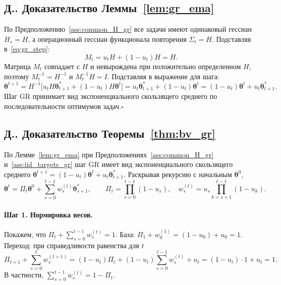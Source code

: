 \documentclass[a4paper,14pt,oneside,openany]{extarticle}
\newcommand{\btheta}{\boldsymbol{\theta}}
\begin{document}
\setcounter{appthm}{0}
\renewcommand{\theappthm}{Д.}

\subsection*{\theappthm. Доказательство Леммы~\ref{lem:gr_ema}}\label{app:proof_gr_ema}

По Предположению~\ref{ass:common_H_gr} все задачи имеют одинаковый гессиан $H_s = H$, а операционный гессиан функционала повторения $\Sigma_t = H$. Подставляя в~\eqref{eq:gr_step}:
\[
    M_t = u_t H + (1 - u_t) H = H.
\]
Матрица $M_t$ совпадает с $H$ и невырождена при положительно определенном $H$, поэтому $M_t^{-1} = H^{-1}$ и $M_t^{-1} H = I$. Подставляя в выражение для шага:
\[
    \btheta^{t+1} = H^{-1}\bigl[u_t H \btheta^*_{t+1} + (1 - u_t) H \btheta^t\bigr] = u_t \btheta^*_{t+1} + (1 - u_t)\btheta^t = (1 - u_t)\btheta^t + u_t \btheta^*_{t+1}.
\]
Шаг GR принимает вид экспоненциального скользящего среднего по последовательности оптимумов задач.\hfill$\square$

\subsection*{\theappthm. Доказательство Теоремы~\ref{thm:bv_gr}}\label{app:proof_bv_gr}

По Лемме~\ref{lem:gr_ema} при Предположениях~\ref{ass:common_H_gr} и~\ref{ass:iid_targets_gr} шаг GR имеет вид экспоненциального скользящего среднего $\btheta^{t+1} = (1 - u_t)\btheta^t + u_t \btheta^*_{t+1}$. Раскрывая рекурсию с начальным $\btheta^0$,
\begin{equation}
    \btheta^t = \Pi_t \btheta^0 + \sum_{s=0}^{t-1} w_s^{(t)} \btheta^*_{s+1}, \qquad \Pi_t = \prod_{s=0}^{t-1}(1 - u_s), \quad w_s^{(t)} = u_s \prod_{k=s+1}^{t-1}(1 - u_k).
    \label{eq:app_unrolled}
\end{equation}

\paragraph{Шаг 1. Нормировка весов.} Покажем, что $\Pi_t + \sum_{s=0}^{t-1} w_s^{(t)} = 1$. База: $\Pi_1 + w_0^{(1)} = (1 - u_0) + u_0 = 1$. Переход: при справедливости равенства для $t$
\[
    \Pi_{t+1} + \sum_{s=0}^{t} w_s^{(t+1)} = (1 - u_t)\Pi_t + (1 - u_t)\sum_{s=0}^{t-1} w_s^{(t)} + u_t = (1 - u_t)\cdot 1 + u_t = 1.
\]
В частности, $\sum_{s=0}^{t-1} w_s^{(t)} = 1 - \Pi_t$.
\end{document}

